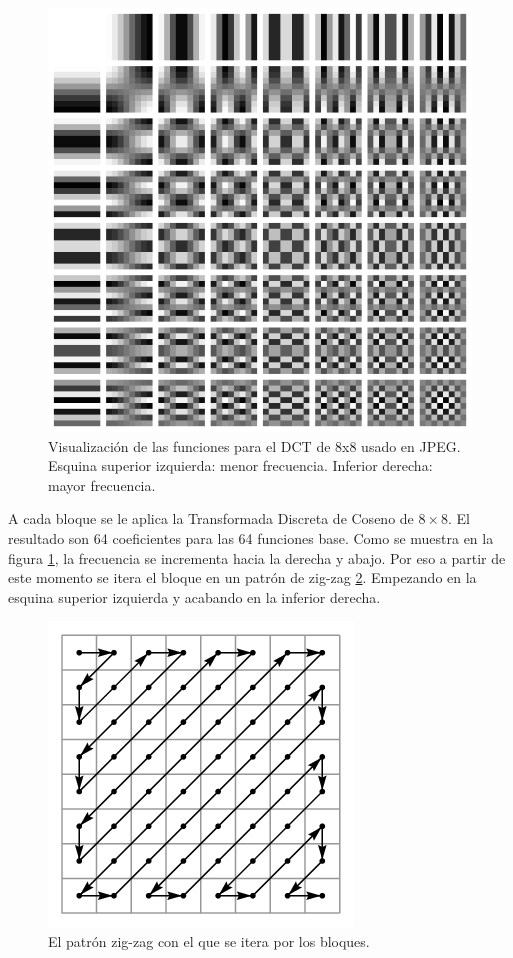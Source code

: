 \begin{figure}[h]
    \includegraphics{DCT-8x8}
    \caption{Visualización de las funciones para el DCT de 8x8 usado en JPEG.
    Esquina superior izquierda: menor frecuencia. Inferior derecha: mayor
frecuencia.}
    \label{fig:dct}
\end{figure}



A cada bloque se le aplica la Transformada Discreta de Coseno de $8\times8$. El
resultado son 64 coeficientes para las 64 funciones base. Como se muestra en la
figura \ref{fig:dct}, la frecuencia se incrementa hacia la derecha y abajo. Por
eso a partir de este momento se itera el bloque en un patrón de zig-zag
\ref{fig:zigzag}. Empezando en la esquina superior izquierda y acabando en la
inferior derecha.

\begin{figure}[h]
    \includegraphics{zigzag}
    \caption{El patrón zig-zag con el que se itera por los bloques.}
    \label{fig:zigzag}
\end{figure}

